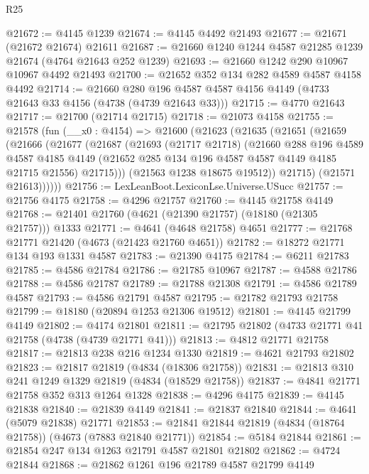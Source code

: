 \begin{lexlean}{R25}
\begin{coremodule}
@21672 := @4145 @1239
@21674 := @4145 @4492 @21493
@21677 := @21671 (@21672 @21674) @21611
@21687 := @21660 @1240 @1244 @4587 @21285 @1239 @21674 (@4764 @21643 @252 @1239)
@21693 := @21660 @1242 @290 @10967 @10967 @4492 @21493
@21700 := @21652 @352 @134 @282 @4589 @4587 @4158 @4492
@21714 := @21660
    @280
    @196
    @4587
    @4587
    @4156
    @4149
    (@4733 @21643 @33 @4156 (@4738 (@4739 @21643 @33)))
@21715 := @4770 @21643
@21717 := @21700 (@21714 @21715)
@21718 := @21073 @4158
@21755 := @21578
    (fun (__x0 : @4154) =>
    @21600
      (@21623
        (@21635
          (@21651
            (@21659
              (@21666
                (@21677
                  (@21687
                    (@21693
                      (@21717 @21718)
                      (@21660
                        @288
                        @196
                        @4589
                        @4587
                        @4185
                        @4149
                        (@21652 @285 @134 @196 @4587 @4587 @4149 @4185 @21715 @21556)
                        @21715)))
                  (@21563 @1238 @18675 @19512))
                @21715)
              (@21571 @21613))))))
@21756 := LexLeanBoot.LexiconLse.Universe.USucc
@21757 := @21756 @4175
@21758 := @4296 @21757
@21760 := @4145 @21758 @4149
@21768 := @21401 @21760 (@4621 (@21390 @21757) (@18180 (@21305 @21757))) @1333
@21771 := @4641 (@4648 @21758) @4651
@21777 := @21768 @21771 @21420 (@4673 (@21423 @21760 @4651))
@21782 := @18272 @21771 @134 @193 @1331 @4587
@21783 := @21390 @4175
@21784 := @6211 @21783
@21785 := @4586 @21784
@21786 := @21785 @10967
@21787 := @4588 @21786
@21788 := @4586 @21787
@21789 := @21788 @21308
@21791 := @4586 @21789 @4587
@21793 := @4586 @21791 @4587
@21795 := @21782 @21793 @21758
@21799 := @18180 (@20894 @1253 @21306 @19512)
@21801 := @4145 @21799 @4149
@21802 := @4174 @21801
@21811 := @21795 @21802 (@4733 @21771 @41 @21758 (@4738 (@4739 @21771 @41)))
@21813 := @4812 @21771 @21758
@21817 := @21813 @238 @216 @1234 @1330
@21819 := @4621 @21793 @21802
@21823 := @21817 @21819 (@4834 (@18306 @21758))
@21831 := @21813 @310 @241 @1249 @1329 @21819 (@4834 (@18529 @21758))
@21837 := @4841 @21771 @21758 @352 @313 @1264 @1328
@21838 := @4296 @4175
@21839 := @4145 @21838
@21840 := @21839 @4149
@21841 := @21837 @21840
@21844 := @4641 (@5079 @21838) @21771
@21853 := @21841 @21844 @21819 (@4834 (@18764 @21758)) (@4673 (@7883 @21840 @21771))
@21854 := @5184 @21844
@21861 := @21854 @247 @134 @1263 @21791 @4587 @21801 @21802
@21862 := @4724 @21844
@21868 := @21862 @1261 @196 @21789 @4587 @21799 @4149

\end{coremodule}
\end{lexlean}
